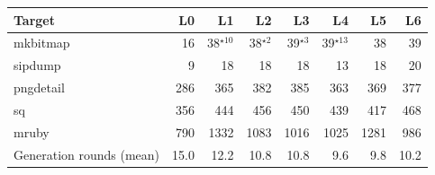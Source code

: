 \begin{tabular}{lrrrrrrr}
\toprule
Target & L0 & L1 & L2 & L3 & L4 & L5 & L6 \\
\midrule
mkbitmap & 16 & 38$^{\star10}$ & 38$^{\star2}$ & 39$^{\star3}$ & 39$^{\star13}$ & 38 & 39 \\
sipdump & 9 & 18 & 18 & 18 & 13 & 18 & 20 \\
pngdetail & 286 & 365 & 382 & 385 & 363 & 369 & 377 \\
sq & 356 & 444 & 456 & 450 & 439 & 417 & 468 \\
mruby & 790 & 1332 & 1083 & 1016 & 1025 & 1281 & 986 \\
\midrule
Generation rounds (mean) & 15.0 & 12.2 & 10.8 & 10.8 & 9.6 & 9.8 & 10.2 \\
\bottomrule
\end{tabular}
